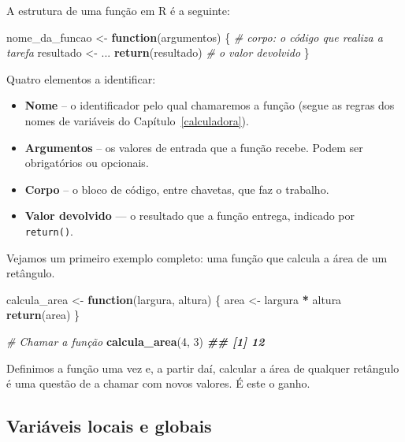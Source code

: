 \documentclass[
  portuguese,
  11pt,
  openany]{book}
\newenvironment{Shaded}{\begin{snugshade}}{\end{snugshade}}
\newcommand{\CommentTok}[1]{\textcolor[rgb]{0.56,0.35,0.01}{\textit{#1}}}
\newcommand{\ControlFlowTok}[1]{\textcolor[rgb]{0.13,0.29,0.53}{\textbf{#1}}}
\newcommand{\DecValTok}[1]{\textcolor[rgb]{0.00,0.00,0.81}{#1}}
\newcommand{\DocumentationTok}[1]{\textcolor[rgb]{0.56,0.35,0.01}{\textbf{\textit{#1}}}}
\newcommand{\FunctionTok}[1]{\textcolor[rgb]{0.13,0.29,0.53}{\textbf{#1}}}
\newcommand{\NormalTok}[1]{#1}
\newcommand{\OtherTok}[1]{\textcolor[rgb]{0.56,0.35,0.01}{#1}}
\newcommand{\SpecialCharTok}[1]{\textcolor[rgb]{0.81,0.36,0.00}{\textbf{#1}}}
\providecommand{\tightlist}{%
  \setlength{\itemsep}{0pt}\setlength{\parskip}{0pt}}
\begin{document}
A estrutura de uma função em R é a seguinte:

\begin{Shaded}
\begin{Highlighting}[]
\NormalTok{nome\_da\_funcao }\OtherTok{\textless{}{-}} \ControlFlowTok{function}\NormalTok{(argumentos) \{}
  \CommentTok{\# corpo: o código que realiza a tarefa}
\NormalTok{  resultado }\OtherTok{\textless{}{-}}\NormalTok{ ...}
  \FunctionTok{return}\NormalTok{(resultado)   }\CommentTok{\# o valor devolvido}
\NormalTok{\}}
\end{Highlighting}
\end{Shaded}

Quatro elementos a identificar:

\begin{itemize}
\tightlist
\item
  \textbf{Nome} -- o identificador pelo qual chamaremos a função (segue as regras dos
  nomes de variáveis do Capítulo~\ref{calculadora}).
\item
  \textbf{Argumentos} -- os valores de entrada que a função recebe. Podem ser
  obrigatórios ou opcionais.
\item
  \textbf{Corpo} -- o bloco de código, entre chavetas, que faz o trabalho.
\item
  \textbf{Valor devolvido} --- o resultado que a função entrega, indicado por
  \texttt{return()}.
\end{itemize}

Vejamos um primeiro exemplo completo: uma função que calcula a área de um
retângulo.

\begin{Shaded}
\begin{Highlighting}[]
\NormalTok{calcula\_area }\OtherTok{\textless{}{-}} \ControlFlowTok{function}\NormalTok{(largura, altura) \{}
\NormalTok{  area }\OtherTok{\textless{}{-}}\NormalTok{ largura }\SpecialCharTok{*}\NormalTok{ altura}
  \FunctionTok{return}\NormalTok{(area)}
\NormalTok{\}}

\CommentTok{\# Chamar a função}
\FunctionTok{calcula\_area}\NormalTok{(}\DecValTok{4}\NormalTok{, }\DecValTok{3}\NormalTok{)}
\DocumentationTok{\#\# [1] 12}
\end{Highlighting}
\end{Shaded}

Definimos a função uma vez e, a partir daí, calcular a área de qualquer retângulo
é uma questão de a chamar com novos valores. É este o ganho.

\subsection{Variáveis locais e globais}\label{variuxe1veis-locais-e-globais}
\end{document}
